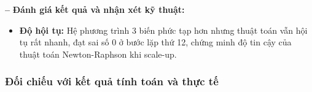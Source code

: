 \noindent \textbf{--} \textbf{Đánh giá kết quả và nhận xét kỹ thuật:}
\begin{itemize}[label=\textbf{+}]
    \item \textbf{Độ hội tụ:} Hệ phương trình 3 biến phức tạp hơn nhưng thuật toán vẫn hội tụ rất nhanh, đạt sai số $0$ ở bước lặp thứ 12, chứng minh độ tin cậy của thuật toán Newton-Raphson khi scale-up.
\end{itemize}
\subsubsection*{Đối chiếu với kết quả tính toán và thực tế}

